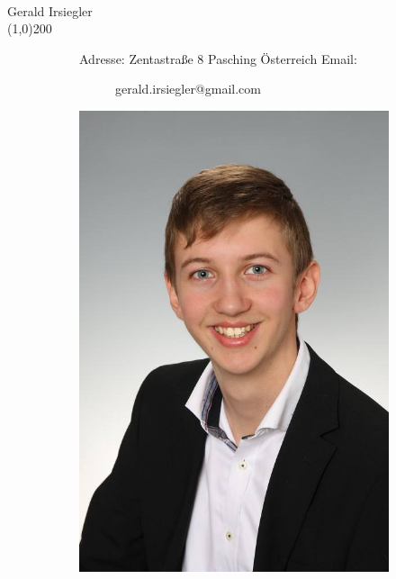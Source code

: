 \documentclass[FIPLY_base.tex]{subfiles}
\begin{document}
	\ \\
	{\Large Gerald Irsiegler}
	\ \\
	\line(1,0){200}
	\begin{figure}[H]
		\begin{subfigure}[b]{0.3\textwidth}
			Adresse: \newline
			Zentastraße 8  Pasching \newline
			Österreich \newline
			\newline
			Email:
			\begin{subfigure}[b]{0.2\textwidth}
				gerald.irsiegler@gmail.com
			\end{subfigure}
		\end{subfigure}
		\hfil
		\begin{subfigure}[b]{0.2\textwidth}
			\includegraphics[scale=0.1]{img/gary}
		\end{subfigure}
	\end{figure}
\end{document}
